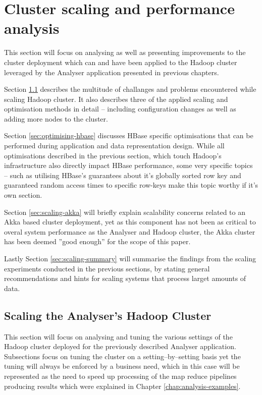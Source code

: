 \chapter{Cluster scaling and performance analysis}
\label{chap:perf-scalability}

This section will focus on analysing as well as presenting improvements to the cluster deployment which can and have been applied to the Hadoop cluster leveraged by the Analyser application presented in previous chapters.

Section \ref{sec:scaling-hadoop} describes the multitude of challanges and problems encountered while scaling Hadoop cluster. It also describes three of the applied scaling and optimisation methods in detail -- including configuration changes as well as adding more nodes to the cluster.

Section \ref{sec:optimising-hbase} discusses HBase specific optimisations that can be performed during application and data representation design. While all optimisations described in the previous section, which touch Hadoop's infrastructure also directly impact HBase performance, some very specific topics -- such as utilising HBase's guarantees about it's globally sorted row key and guaranteed random access times to specific row-keys make this topic worthy if it's own section.

Section \ref{sec:scaling-akka} will briefly explain scalability concerns related to an Akka based cluster deployment, yet as this component has not been as critical to overal system performance as the Analyser and Hadoop cluster, the Akka cluster has been deemed ''good enough'' for the scope of this paper.

Lastly Section \ref{sec:scaling-summary} will summarise the findings from the scaling experiments conducted in the previous sections, by stating general recommendations and hints for scaling systems that process larget amounts of data.

\section{Scaling the Analyser's Hadoop Cluster}
\label{sec:scaling-hadoop}
This section will focus on analysing and tuning the various settings of the Hadoop cluster deployed for the previously described Analyser application. Subsections focus on tuning the cluster on a setting--by--setting basis yet the tuning will always be enforced by a business need, which in this case will be represented as the need to speed up processing of the map reduce pipelines producing results which were explained in Chapter \ref{chap:analysis-examples}.

